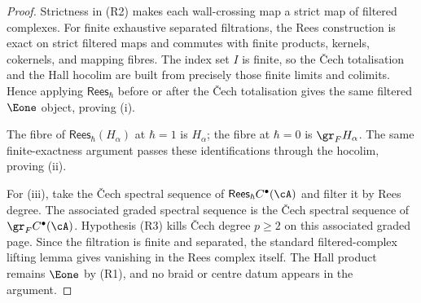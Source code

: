 \begin{proof}
Strictness in \textup{(R2)} makes each wall-crossing map a strict map of
filtered complexes. For finite exhaustive separated filtrations,
the Rees construction is exact on strict filtered maps and commutes with
finite products, kernels, cokernels, and mapping fibres. The index set
\(I\) is finite, so the \v{C}ech totalisation and the Hall hocolim are built
from precisely those finite limits and colimits. Hence applying
\(\mathsf{Rees}_\hbar\) before or after the \v{C}ech totalisation gives the
same filtered $\Eone$ object, proving \textup{(i)}.

The fibre of \(\mathsf{Rees}_\hbar(H_\alpha)\) at \(\hbar=1\) is
\(H_\alpha\); the fibre at \(\hbar=0\) is \(\gr_F H_\alpha\). The same
finite-exactness argument passes these identifications through the
hocolim, proving \textup{(ii)}.

For \textup{(iii)}, take the \v{C}ech spectral sequence of
\(\mathsf{Rees}_\hbar C^\bullet(\cA)\) and filter it by Rees degree.
The associated graded spectral sequence is the \v{C}ech spectral sequence
of \(\gr_F C^\bullet(\cA)\). Hypothesis \textup{(R3)} kills \v{C}ech degree
\(p\geq2\) on this associated graded page. Since the filtration is
finite and separated, the standard filtered-complex lifting lemma gives
vanishing in the Rees complex itself. The Hall product remains
$\Eone$ by \textup{(R1)}, and no braid or centre datum appears in the
argument.
\end{proof}

